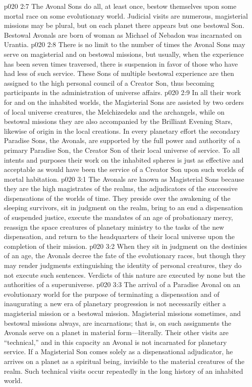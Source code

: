 \pc \vs p020 2:7 \bibnobreakspace {} The Avonal Sons do all, at least once, bestow themselves upon some mortal race on some evolutionary world. Judicial visits are numerous, magisterial missions may be plural, but on each planet there appears but one bestowal Son. Bestowal Avonals are born of woman as Michael of Nebadon was incarnated on Urantia.
\pc \vs p020 2:8 There is no limit to the number of times the Avonal Sons may serve on magisterial and on bestowal missions, but usually, when the experience has been seven times traversed, there is suspension in favor of those who have had less of such service. These Sons of multiple bestowal experience are then assigned to the high personal council of a Creator Son, thus becoming participants in the administration of universe affairs.
\vs p020 2:9 In all their work for and on the inhabited worlds, the Magisterial Sons are assisted by two orders of local universe creatures, the Melchizedeks and the archangels, while on bestowal missions they are also accompanied by the Brilliant Evening Stars, likewise of origin in the local creations. In every planetary effort the secondary Paradise Sons, the Avonals, are supported by the full power and authority of a primary Paradise Son, the Creator Son of their local universe of service. To all intents and purposes their work on the inhabited spheres is just as effective and acceptable as would have been the service of a Creator Son upon such worlds of mortal habitation.
\vs p020 3:1 The Avonals are known as Magisterial Sons because they are the high magistrates of the realms, the adjudicators of the successive dispensations of the worlds of time. They preside over the awakening of the sleeping survivors, sit in judgment on the realm, bring to an end a dispensation of suspended justice, execute the mandates of an age of probationary mercy, reassign the space creatures of planetary ministry to the tasks of the new dispensation, and return to the headquarters of their local universe upon the completion of their mission.
\vs p020 3:2 When they sit in judgment on the destinies of an age, the Avonals decree the fate of the evolutionary races, but though they may render judgments extinguishing the identity of personal creatures, they do not execute such sentences. Verdicts of this nature are executed by none but the authorities of a superuniverse.
\vs p020 3:3 The arrival of a Paradise Avonal on an evolutionary world for the purpose of terminating a dispensation and of inaugurating a new era of planetary progression is not necessarily either a magisterial mission or a bestowal mission. Magisterial missions sometimes, and bestowal missions always, are incarnations; that is, on such assignments the Avonals serve on a planet in material form---literally. Their other visits are “technical,” and in this capacity an Avonal is not incarnated for planetary service. If a Magisterial Son comes solely as a dispensational adjudicator, he arrives on a planet as a spiritual being, invisible to the material creatures of the realm. Such technical visits occur repeatedly in the long history of an inhabited world.\plusone
